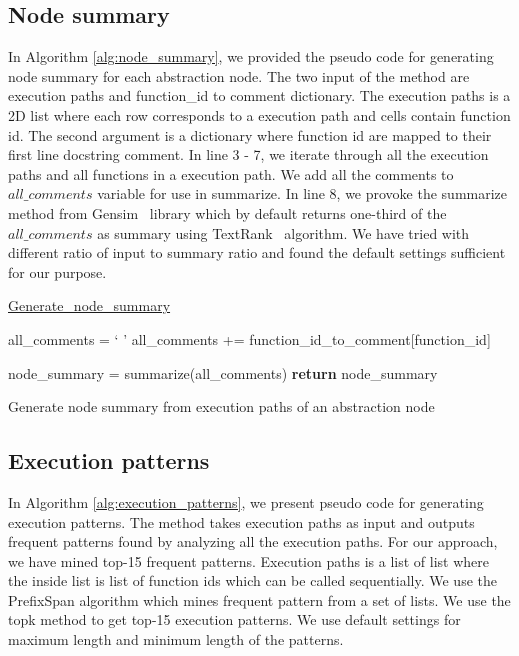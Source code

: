 \subsection{Node summary}

In Algorithm \ref{alg:node_summary}, we provided the pseudo code for generating node summary for each abstraction node. The two input of the method are execution paths and function\_id to comment dictionary. The execution paths is a 2D list where each row corresponds to a execution path and cells contain function id. The second argument is a dictionary where function id are mapped to their first line docstring comment. In line 3 - 7, we iterate through all the execution paths and all functions in a execution path. We add all the comments to $all\_comments$ variable for use in summarize. In line 8, we provoke the summarize method from Gensim~\cite{gensim} library which by default returns one-third of the $all\_comments$ as summary using  TextRank~\cite{mihalcea2004textrank} algorithm. We have tried with different ratio of input to summary ratio and found the default settings sufficient for our purpose.

\begin{algorithm}

    \underline{Generate\_node\_summary} 
    
    all\_comments = ` '\;
    {
        {
            all\_comments += function\_id\_to\_comment[function\_id]\;
        }
    }
    
    node\_summary = summarize(all\_comments)\; 
    \textbf{return} node\_summary
    \caption{Generate node summary from execution paths of an abstraction node}
    \label{alg:node_summary}
\end{algorithm}

\subsection{Execution patterns}
In Algorithm \ref{alg:execution_patterns}, we present pseudo code for generating execution patterns. The method takes execution paths as input and outputs frequent patterns found by analyzing all the execution paths. For our approach, we have mined top-15 frequent patterns. Execution paths is a list of list where the inside list is list of function ids which can be called sequentially. We use the PrefixSpan algorithm which mines frequent pattern from a set of lists. We use the topk method to get top-15 execution patterns. We use default settings for maximum length and minimum length of the patterns. 

